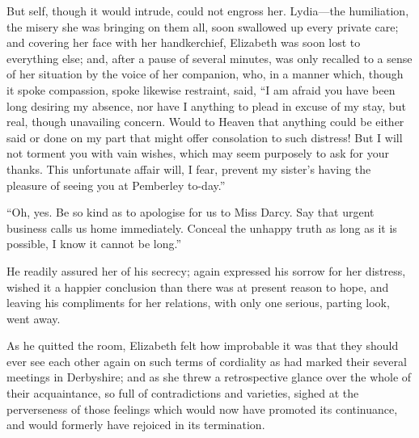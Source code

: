 \documentclass[12pt,english]{book}
\begin{document}
But self, though it would intrude, could not engross her. Lydia\mbox{---}the
humiliation, the misery she was bringing on them all, soon swallowed
up every private care; and covering her face with her handkerchief,
Elizabeth was soon lost to everything else; and, after a pause of
several minutes, was only recalled to a sense of her situation by
the voice of her companion, who, in a manner which, though it spoke
compassion, spoke likewise restraint, said, {}``I am afraid you have
been long desiring my absence, nor have I anything to plead in excuse
of my stay, but real, though unavailing concern. Would to Heaven that
anything could be either said or done on my part that might offer
consolation to such distress! But I will not torment you with vain
wishes, which may seem purposely to ask for your thanks. This unfortunate
affair will, I fear, prevent my sister's having the pleasure of seeing
you at Pemberley to-day.''

{}``Oh, yes. Be so kind as to apologise for us to Miss Darcy. Say
that urgent business calls us home immediately. Conceal the unhappy
truth as long as it is possible, I know it cannot be long.''

He readily assured her of his secrecy; again expressed his sorrow
for her distress, wished it a happier conclusion than there was at
present reason to hope, and leaving his compliments for her relations,
with only one serious, parting look, went away.

As he quitted the room, Elizabeth felt how improbable it was that
they should ever see each other again on such terms of cordiality
as had marked their several meetings in Derbyshire; and as she threw
a retrospective glance over the whole of their acquaintance, so full
of contradictions and varieties, sighed at the perverseness of those
feelings which would now have promoted its continuance, and would
formerly have rejoiced in its termination.
\end{document}
